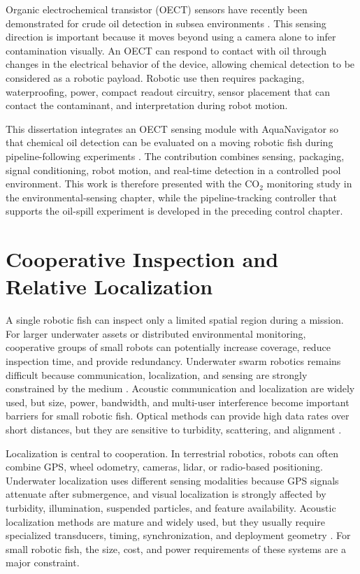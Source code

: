 \documentclass{uhcoethesis}
\begin{document}
Organic electrochemical transistor (OECT) sensors have recently been demonstrated for crude oil detection in subsea environments \cite{Porter2024}. This sensing direction is important because it moves beyond using a camera alone to infer contamination visually. An OECT can respond to contact with oil through changes in the electrical behavior of the device, allowing chemical detection to be considered as a robotic payload. Robotic use then requires packaging, waterproofing, power, compact readout circuitry, sensor placement that can contact the contaminant, and interpretation during robot motion.

This dissertation integrates an OECT sensing module with AquaNavigator so that chemical oil detection can be evaluated on a moving robotic fish during pipeline-following experiments \cite{Masood2026OilSpill}. The contribution combines sensing, packaging, signal conditioning, robot motion, and real-time detection in a controlled pool environment. This work is therefore presented with the \mbox{CO$_2$} monitoring study in the environmental-sensing chapter, while the pipeline-tracking controller that supports the oil-spill experiment is developed in the preceding control chapter.

\section{Cooperative Inspection and Relative Localization}

A single robotic fish can inspect only a limited spatial region during a mission. For larger underwater assets or distributed environmental monitoring, cooperative groups of small robots can potentially increase coverage, reduce inspection time, and provide redundancy. Underwater swarm robotics remains difficult because communication, localization, and sensing are strongly constrained by the medium \cite{Connor2021}. Acoustic communication and localization are widely used, but size, power, bandwidth, and multi-user interference become important barriers for small robotic fish. Optical methods can provide high data rates over short distances, but they are sensitive to turbidity, scattering, and alignment \cite{Partan2007}.

Localization is central to cooperation. In terrestrial robotics, robots can often combine GPS, wheel odometry, cameras, lidar, or radio-based positioning. Underwater localization uses different sensing modalities because GPS signals attenuate after submergence, and visual localization is strongly affected by turbidity, illumination, suspended particles, and feature availability. Acoustic localization methods are mature and widely used, but they usually require specialized transducers, timing, synchronization, and deployment geometry \cite{Luo2021,Su2020}. For small robotic fish, the size, cost, and power requirements of these systems are a major constraint.
\end{document}
